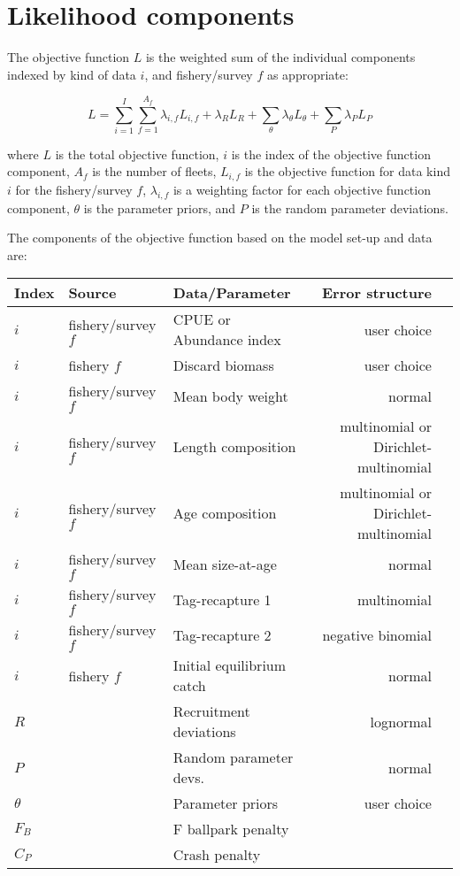 \section{Likelihood components}

The objective function $L$ is the weighted sum of the individual components
indexed by kind of data $i$, and fishery/survey $f$ as appropriate:

\begin{equation}
	L = \sum_{i=1}^{I}\sum_{f=1}^{A_f}\lambda_{i,f} L_{i,f}+\lambda_R L_R + \sum_{\theta}^{}\lambda_\theta L_\theta + \sum_{P}^{}\lambda_P L_P
\end{equation}

where $L$ is the total objective function, $i$ is the index of the objective
function component, $A_f$ is the number of fleets, $L_{i,f}$ is the
objective function for data kind $i$ for the fishery/survey $f$,
$\lambda_{i,f}$ is a weighting factor for each objective function component,
$\theta$ is the parameter priors, and $P$ is the random parameter deviations.

The components of the objective function based on the model set-up and data are: 

\begin{longtable}{p{1cm} p{3.5cm} p{5.5cm} Rp{5cm}}
	\hline
	Index & Source & Data/Parameter & Error structure\Tstrut\Bstrut\\
	\hline	
	$i$ & fishery/survey $f$ & CPUE or Abundance index & user choice \Tstrut\\
	$i$ & fishery $f$        & Discard biomass         & user choice \Tstrut\\
	$i$ & fishery/survey $f$ & Mean body weight        & normal \Tstrut\\
	$i$ & fishery/survey $f$ & Length composition      & multinomial or Dirichlet-multinomial\Tstrut\\
	$i$ & fishery/survey $f$ & Age composition         & multinomial or Dirichlet-multinomial\Tstrut\\
	$i$ & fishery/survey $f$ & Mean size-at-age        & normal \Tstrut\\
	$i$ & fishery/survey $f$ & Tag-recapture 1         & multinomial \Tstrut\\
	$i$ & fishery/survey $f$ & Tag-recapture 2         & negative binomial\Tstrut\\
	$i$ & fishery $f$        & Initial equilibrium catch & normal \Tstrut\\
	$R$ & 					 & Recruitment deviations  & lognormal \Tstrut\\
	$P$ & 					 & Random parameter devs.  & normal \Tstrut\\
	$\theta$ & 				 & Parameter priors	       & user choice\Tstrut\\
	$F_B$ & 				 & F ballpark penalty	   &  \Tstrut\\
	$C_P$ &				     & Crash penalty           &  \Tstrut\Bstrut\\
	\hline
\end{longtable}

